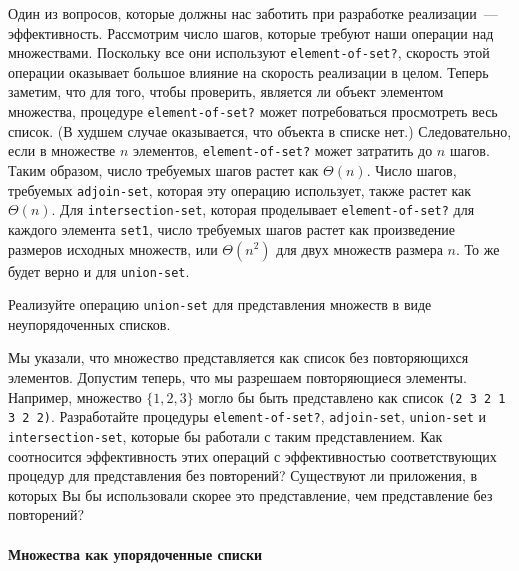 Один из вопросов, которые должны нас заботить при
разработке реализации~--- эффективность.  Рассмотрим число шагов,
которые требуют наши операции над множествами.  Поскольку все они
используют {\tt element-of-set?}, скорость этой операции
оказывает большое влияние на скорость реализации в целом.  Теперь
заметим, что для того, чтобы проверить, является ли объект элементом
множества, процедуре {\tt element-of-set?} может потребоваться
просмотреть весь список. (В худшем случае оказывается, что объекта в
списке нет.)  Следовательно, если в множестве $n$
элементов,  {\tt element-of-set?} может затратить до
$n$ шагов.  Таким образом, число требуемых шагов растет как 
$\Theta (n)$.  Число шагов, требуемых
{\tt adjoin-set}, которая эту операцию использует, также растет 
как $\Theta (n)$.  Для {\tt intersection-set},
которая проделывает {\tt element-of-set?} для каждого элемента
{\tt set1}, число требуемых шагов растет как произведение
размеров исходных множеств, или $\Theta (n^2)$ для двух
множеств размера $n$.  То же будет верно и для
{\tt union-set}.
\begin{exercise}{2.59}\label{EX2.59}%
Реализуйте операцию  {\tt union-set} для
представления множеств в виде неупорядоченных списков.
\end{exercise}
\begin{exercise}{2.60}\label{EX2.60}%
Мы указали, что множество представляется как список без 
повторяющихся элементов. Допустим теперь, что мы разрешаем
повторяющиеся элементы. Например, множество $\{1, 2, 3\}$
могло бы быть представлено как список {\tt (2 3 2 1 3 2 2)}.
Разработайте процедуры {\tt element-of-set?},
{\tt adjoin-set}, {\tt union-set} и
{\tt intersection-set}, которые бы работали с таким
представлением.  Как соотносится эффективность этих операций с
эффективностью соответствующих процедур для представления без
повторений?  Существуют ли приложения, в которых Вы бы использовали
скорее это представление, чем представление без повторений?
\end{exercise}

\paragraph{Множества как упорядоченные списки}


